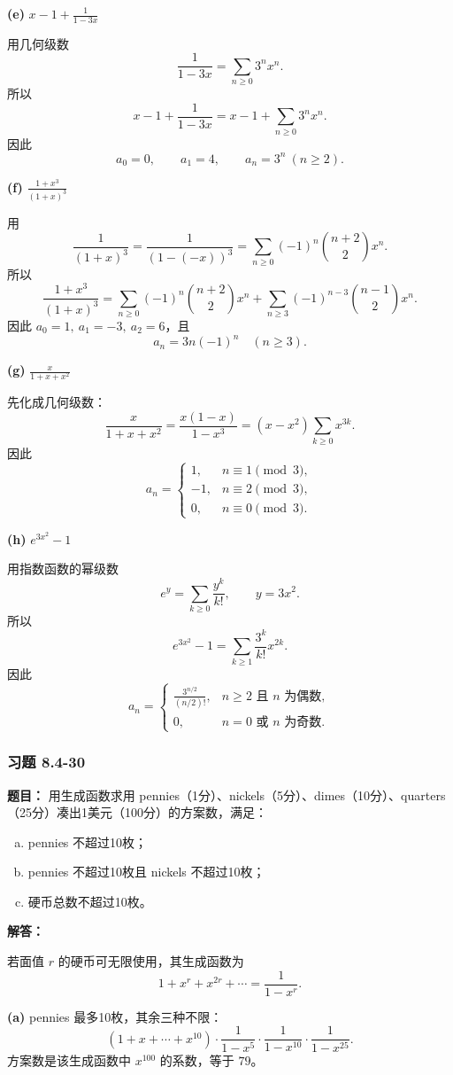 \documentclass[11pt,UTF8]{article}
\begin{document}
\textbf{(e)} $\displaystyle x-1+\frac{1}{1-3x}$

用几何级数
\[ \frac{1}{1-3x}=\sum_{n\ge 0}3^nx^n. \]
所以
\[ x-1+\frac{1}{1-3x}=x-1+\sum_{n\ge 0}3^nx^n. \]
因此
\[ a_0=0,\qquad a_1=4,\qquad a_n=3^n\ (n\ge 2). \]

\textbf{(f)} $\displaystyle\frac{1+x^3}{(1+x)^3}$

用
\[ \frac{1}{(1+x)^3}=\frac{1}{(1-(-x))^3}=\sum_{n\ge 0}(-1)^n\binom{n+2}{2}x^n. \]
所以
\[ \frac{1+x^3}{(1+x)^3}=\sum_{n\ge 0}(-1)^n\binom{n+2}{2}x^n+\sum_{n\ge 3}(-1)^{n-3}\binom{n-1}{2}x^n. \]
因此 $a_0=1,\ a_1=-3,\ a_2=6$，且
\[ a_n=3n(-1)^n\quad (n\ge 3). \]

\textbf{(g)} $\displaystyle\frac{x}{1+x+x^2}$

先化成几何级数：
\[ \frac{x}{1+x+x^2}=\frac{x(1-x)}{1-x^3}=(x-x^2)\sum_{k\ge 0}x^{3k}. \]
因此
\[ a_n=\begin{cases}
1, & n\equiv 1\pmod 3,\\
-1, & n\equiv 2\pmod 3,\\
0, & n\equiv 0\pmod 3.
\end{cases} \]

\textbf{(h)} $e^{3x^2}-1$

用指数函数的幂级数
\[ e^y=\sum_{k\ge 0}\frac{y^k}{k!},\qquad y=3x^2. \]
所以
\[ e^{3x^2}-1=\sum_{k\ge 1}\frac{3^k}{k!}x^{2k}. \]
因此
\[ a_n=\begin{cases}
\displaystyle\frac{3^{n/2}}{(n/2)!}, & n\ge 2\text{ 且 }n\text{ 为偶数},\\[8pt]
0, & n=0\text{ 或 }n\text{ 为奇数}.
\end{cases} \]

\subsubsection*{习题 8.4-30}
\textbf{题目：} 用生成函数求用 pennies（1分）、nickels（5分）、dimes（10分）、quarters（25分）凑出1美元（100分）的方案数，满足：
\begin{enumerate}[a)]
    \item pennies 不超过10枚；
    \item pennies 不超过10枚且 nickels 不超过10枚；
    \item 硬币总数不超过10枚。
\end{enumerate}

\textbf{解答：}

若面值 $r$ 的硬币可无限使用，其生成函数为
\[ 1+x^r+x^{2r}+\cdots=\frac{1}{1-x^r}. \]

\textbf{(a)} pennies 最多10枚，其余三种不限：
\[ (1+x+\cdots+x^{10})\cdot\frac{1}{1-x^5}\cdot\frac{1}{1-x^{10}}\cdot\frac{1}{1-x^{25}}. \]
方案数是该生成函数中 $x^{100}$ 的系数，等于 $\boxed{79}$。
\end{document}
